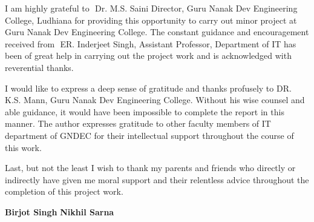 \begin{Large}
\end{Large}
\vskip 0.1in I am  highly grateful to ​
Dr. M.S. Saini Director, Guru Nanak Dev Engineering  
College, Ludhiana for providing this opportunity to carry out minor project at Guru Nanak  
Dev Engineering College. The constant guidance and encouragement received from ​
ER. Inderjeet Singh, Assistant Professor, Department of IT has been of great help in carrying out the project work and is acknowledged with reverential thanks.

I would like to express a deep sense of gratitude and thanks profusely to DR. K.S. Mann, Guru Nanak Dev Engineering College. Without his wise counsel and able guidance, it would have been impossible to complete the report in this manner. The author expresses gratitude to other faculty members of IT department of GNDEC for their intellectual support throughout the course of this work.

Last, but not the least I wish to thank my parents and friends who directly or indirectly have given me moral support and their relentless advice throughout the completion of this project work. 

\vskip 0.4in
\noindent \textbf{Birjot Singh}
\newline
\noindent \textbf{Nikhil Sarna}
